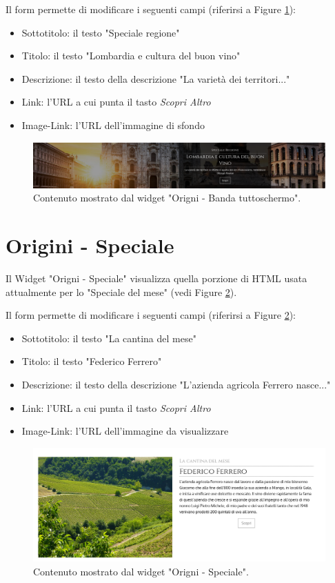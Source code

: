 Il form permette di modificare i seguenti campi (riferirsi a Figure \ref{fig:oreg}):
\begin{itemize}
\item Sottotitolo: il testo "Speciale regione"
\item Titolo: il testo "Lombardia e cultura del buon vino"
\item Descrizione: il testo della descrizione "La varietà dei territori..."
\item Link: l'URL a cui punta il tasto \emph{Scopri Altro}
\item Image-Link: l'URL dell'immagine di sfondo
\end{itemize}

\begin{figure}
  \includegraphics[width=\textwidth]{figure/oreg.png}
  \caption{Contenuto mostrato dal widget "Origni - Banda tuttoschermo".}
  \label{fig:oreg}
\end{figure}

\newpage
\section{Origini - Speciale}
Il Widget "Origni - Speciale" visualizza quella porzione di HTML
usata attualmente per lo "Speciale del mese" (vedi Figure \ref{fig:ospec}).

Il form permette di modificare i seguenti campi (riferirsi a Figure \ref{fig:ospec}):
\begin{itemize}
\item Sottotitolo: il testo "La cantina del mese"
\item Titolo: il testo "Federico Ferrero"
\item Descrizione: il testo della descrizione "L’azienda agricola Ferrero nasce..."
\item Link: l'URL a cui punta il tasto \emph{Scopri Altro}
\item Image-Link: l'URL dell'immagine da visualizzare
\end{itemize}

\begin{figure}
  \includegraphics[width=\textwidth]{figure/ospec.png}
  \caption{Contenuto mostrato dal widget "Origni - Speciale".}
  \label{fig:ospec}
\end{figure}

